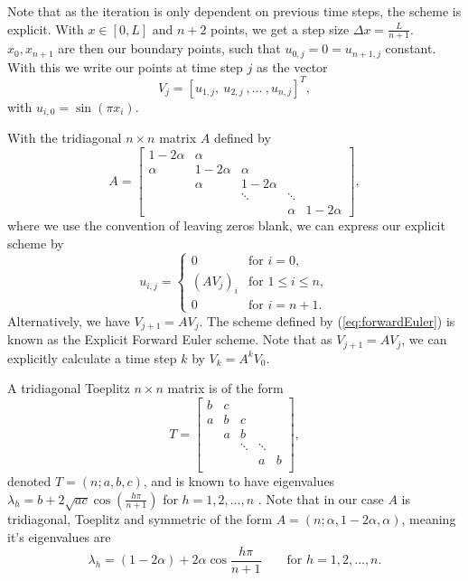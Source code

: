 \documentclass{article}
\theoremstyle{definition}
\begin{document}
Note that as the iteration is only dependent on previous time steps, the scheme is explicit. With $x \in [0, L]$ and $n+2$ points, we get a step size $\Delta x = \frac{L}{n+1}$. $x_0, x_{n+1}$ are then our boundary points, such that $u_{0, j} = 0 = u_{n+1, j}$ constant. With this we write our points at time step $j$ as the vector
\begin{equation*}
    V_j = [u_{1, j}, \ u_{2, j} \ , \ldots \ , u_{n, j}]^T,
\end{equation*}
with $u_{i,0} = \sin(\pi x_i)$.

With the tridiagonal $n \times n$ matrix $A$ defined by
\begin{equation*}
    A = 
    \begin{bmatrix}
        1 - 2\alpha & \alpha & & & \\
        \alpha & 1 - 2\alpha & \alpha & & \\
        & \alpha & 1 - 2\alpha & & \\
        & & \ddots & \ddots & \\
        & & & \alpha & 1 - 2 \alpha
    \end{bmatrix},
\end{equation*}
where we use the convention of leaving zeros blank, we can express our explicit scheme by
\begin{equation} \label{eq:MatrixVecExpr}
    u_{i,j}
    =
    \begin{cases}
        0           & \text{for } i = 0, \\
        (A V_j)_i   & \text{for } 1 \leq i \leq n, \\
        0           & \text{for } i = n + 1.
    \end{cases}
\end{equation}
Alternatively, we have $V_{j+1} = AV_j$. The scheme defined by (\ref{eq:forwardEuler}) is known as the Explicit Forward Euler scheme. Note that as $V_{j+1} = AV_j$, we can explicitly calculate a time step $k$ by $V_k = A^k V_0$.

A tridiagonal Toeplitz $n \times n$ matrix is of the form
\begin{equation*}
    T = \begin{bmatrix}
        b & c &  &  & \\
        a & b & c &  & \\
         & a & b &  & \\
         &  & \ddots & \ddots & \\
         &  &  & a & b \\
    \end{bmatrix},
\end{equation*}
denoted $T = (n; a, b, c)$, and is known to have eigenvalues $\lambda_h = b + 2\sqrt{ac} \cos(\frac{h\pi}{n + 1})$ for $h = 1, 2, \ldots, n$ \parencite{toeplitz}. Note that in our case $A$ is tridiagonal, Toeplitz and symmetric of the form $A = (n; \alpha, 1 - 2\alpha, \alpha)$, meaning it's eigenvalues are
\begin{equation*}
    \lambda_h = (1 - 2\alpha) + 2\alpha \cos\frac{h\pi}{n + 1} \qquad \text{for } h = 1, 2, \ldots, n.
\end{equation*}
\end{document}
